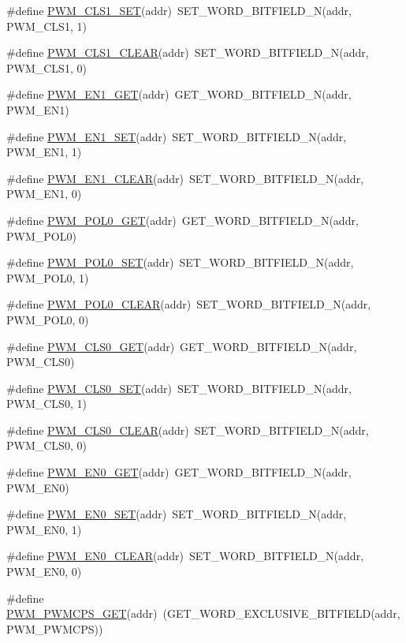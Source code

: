 \begin{DoxyCompactItemize}
\#define \hyperlink{a00564_af74ce61781a665d55d1ee4250668b33d}{PWM\_\-CLS1\_\-SET}(addr)~SET\_\-WORD\_\-BITFIELD\_\-N(addr, PWM\_\-CLS1, 1)
\item 
\#define \hyperlink{a00564_ad14da03f8413dd7ea49705c8407d0742}{PWM\_\-CLS1\_\-CLEAR}(addr)~SET\_\-WORD\_\-BITFIELD\_\-N(addr, PWM\_\-CLS1, 0)
\item 
\#define \hyperlink{a00564_aeb1489216bb185b2585f738b6c600f3a}{PWM\_\-EN1\_\-GET}(addr)~GET\_\-WORD\_\-BITFIELD\_\-N(addr, PWM\_\-EN1)
\item 
\#define \hyperlink{a00564_acdabe8d1151b6554b11e48c125be50f5}{PWM\_\-EN1\_\-SET}(addr)~SET\_\-WORD\_\-BITFIELD\_\-N(addr, PWM\_\-EN1, 1)
\item 
\#define \hyperlink{a00564_ab0e2c328397c79db3ac0ab71cd90a02e}{PWM\_\-EN1\_\-CLEAR}(addr)~SET\_\-WORD\_\-BITFIELD\_\-N(addr, PWM\_\-EN1, 0)
\item 
\#define \hyperlink{a00564_ab053c37a5ad78b9a3634a5d7907786e2}{PWM\_\-POL0\_\-GET}(addr)~GET\_\-WORD\_\-BITFIELD\_\-N(addr, PWM\_\-POL0)
\item 
\#define \hyperlink{a00564_a23974fba299be6bb27c67a2e529d7018}{PWM\_\-POL0\_\-SET}(addr)~SET\_\-WORD\_\-BITFIELD\_\-N(addr, PWM\_\-POL0, 1)
\item 
\#define \hyperlink{a00564_a056abf01d914aaa1b97134414fe649b4}{PWM\_\-POL0\_\-CLEAR}(addr)~SET\_\-WORD\_\-BITFIELD\_\-N(addr, PWM\_\-POL0, 0)
\item 
\#define \hyperlink{a00564_a0bab0efa676fb73652087e4614b9d333}{PWM\_\-CLS0\_\-GET}(addr)~GET\_\-WORD\_\-BITFIELD\_\-N(addr, PWM\_\-CLS0)
\item 
\#define \hyperlink{a00564_a48025db825d2e6af9549b185761bef9f}{PWM\_\-CLS0\_\-SET}(addr)~SET\_\-WORD\_\-BITFIELD\_\-N(addr, PWM\_\-CLS0, 1)
\item 
\#define \hyperlink{a00564_a1fd2b9908d334f02cfd31d12c3c234a2}{PWM\_\-CLS0\_\-CLEAR}(addr)~SET\_\-WORD\_\-BITFIELD\_\-N(addr, PWM\_\-CLS0, 0)
\item 
\#define \hyperlink{a00564_aa6094a998396ecf9acb2e07fc581d49f}{PWM\_\-EN0\_\-GET}(addr)~GET\_\-WORD\_\-BITFIELD\_\-N(addr, PWM\_\-EN0)
\item 
\#define \hyperlink{a00564_a57752a099ffdae1e07ccad1a0fe37a73}{PWM\_\-EN0\_\-SET}(addr)~SET\_\-WORD\_\-BITFIELD\_\-N(addr, PWM\_\-EN0, 1)
\item 
\#define \hyperlink{a00564_ad02f26a336a3d7068d60d970ae48d0fc}{PWM\_\-EN0\_\-CLEAR}(addr)~SET\_\-WORD\_\-BITFIELD\_\-N(addr, PWM\_\-EN0, 0)
\item 
\#define \hyperlink{a00564_a2a214b3e7868ddd56c44b2eabdc42ca4}{PWM\_\-PWMCPS\_\-GET}(addr)~(GET\_\-WORD\_\-EXCLUSIVE\_\-BITFIELD(addr, PWM\_\-PWMCPS))

\end{DoxyCompactItemize}
